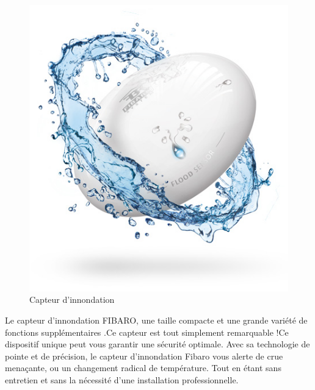 \begin{description}
\begin{figure}[h!]
	\center
	\includegraphics[scale=0.5]{./Images/jpg/floodSensor_FibaroDevice.jpg}
	\caption{Capteur d'innondation}
\end{figure}

Le capteur d'innondation FIBARO, une taille compacte et une grande variété de fonctions supplémentaires .Ce capteur est tout simplement remarquable !Ce dispositif unique peut vous garantir une sécurité optimale. Avec sa technologie de pointe et de précision, le capteur d'innondation Fibaro vous alerte de crue menaçante, ou un changement radical de température. Tout en étant sans entretien et sans la nécessité d'une installation professionnelle.

\clearpage
\newpage


\end{description}
